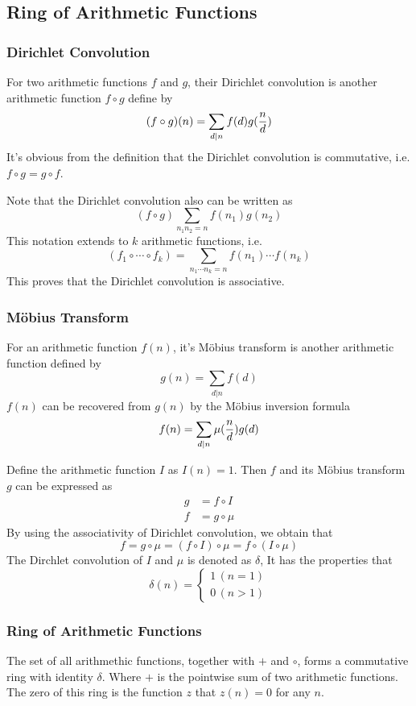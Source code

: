 \documentclass{article}
\begin{document}
\subsection{Ring of Arithmetic Functions}
\subsubsection*{Dirichlet Convolution}
For two arithmetic functions $f$ and $g$, their Dirichlet convolution
is another arithmetic function $f \circ g$ define by
$$(f \circ g)(n) = \sum_{d \vert n} f(d) g({n \over d})$$
It's obvious from the definition that the Dirichlet convolution is commutative,
i.e. $f \circ g = g \circ f$.

Note that the Dirichlet convolution also can be written as
$$(f \circ g) \sum_{n_1 n_2 = n} f(n_1) g(n_2)$$
This notation extends to $k$ arithmetic functions,
i.e. $$(f_1 \circ \cdots \circ f_k) = \sum_{n_1 \cdots n_k = n} f(n_1) \cdots f(n_k)$$
This proves that the Dirichlet convolution is associative.

\subsubsection*{M\"obius Transform}
For an arithmetic function $f(n)$, it's M\"obius transform is another arithmetic function
defined by $$g(n) = \sum_{d \vert n} f(d)$$
$f(n)$ can be recovered from $g(n)$ by the M\"obius inversion formula
$$f(n) = \sum_{d \vert n} \mu({n \over d}) g(d)$$

Define the arithmetic function $I$ as $I(n) = 1$.
Then $f$ and its M\"obius transform $g$ can be expressed as
\begin{align*}
  g &= f \circ I \\
  f &= g \circ \mu
\end{align*}
By using the associativity of Dirichlet convolution, we obtain that
$$f = g \circ \mu = (f \circ I) \circ \mu = f \circ (I \circ \mu)$$
The Dirchlet convolution of $I$ and $\mu$ is denoted as $\delta$,
It has the properties that
\begin{equation*}
  \delta(n) =
  \begin{cases}
    1 \, (n = 1) \\
    0 \, (n > 1)
  \end{cases}
\end{equation*}

\subsubsection*{Ring of Arithmetic Functions}
The set of all arithmethic functions, together with $+$ and $\circ$, forms a commutative ring with identity $\delta$.
Where $+$ is the pointwise sum of two arithmetic functions.
The zero of this ring is the function $z$ that $z(n) = 0$ for any $n$.
\end{document}
